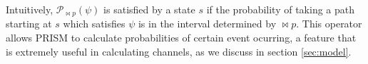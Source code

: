 Intuitively, $\mathcal{P}_{\bowtie p}(\psi)$ is satisfied by a state $s$ 
if the probability of taking a path starting at $s$ which satisfies $\psi$ 
is in the interval determined by $\bowtie p$. 
This operator allows PRISM to calculate probabilities of certain event ocurring,
a feature that is extremely useful in calculating channels,
as we discuss in section \ref{sec:model}.



%

